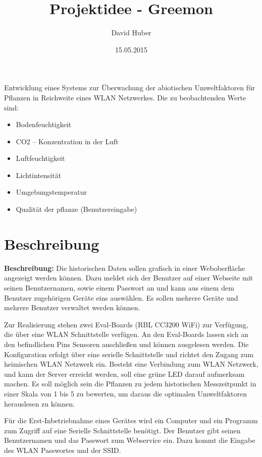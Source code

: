 \documentclass[pointlessnumbers]{scrartcl}
\title{Projektidee - Greemon}
\author{David Huber}
\date{15.05.2015}
\begin{document}
\maketitle

Entwicklung eines Systems zur Überwachung der abiotischen Umweltfaktoren für Pflanzen in Reichweite eines WLAN Netzwerkes. Die zu beobachtenden Werte sind: 

\begin{itemize}
  \item Bodenfeuchtigkeit 
  \item CO2 – Konzentration in der Luft 
  \item Luftfeuchtigkeit 
  \item Lichtintensität
  \item Umgebungstemperatur
  \item Qualität der pflanze (Benutzereingabe)
\end{itemize}

\section*{Beschreibung}
\textbf{Beschreibung:} Die historischen Daten sollen grafisch in einer Weboberfläche angezeigt werden können. Dazu meldet sich der Benutzer auf einer Webseite mit seinen Benutzernamen, sowie einem Passwort an und kann aus einem dem Benutzer zugehörigen Geräte eins auswählen. Es sollen mehrere Geräte und mehrere Benutzer verwaltet werden können. 

Zur Realisierung stehen zwei Eval-Boards (RBL CC3200 WiFi) zur Verfügung, die über eine WLAN Schnittstelle verfügen. 
An den Eval-Boards lassen sich an den befindlichen Pins Sensoren anschließen und können ausgelesen werden. 
Die Konfiguration erfolgt über eine serielle Schnittstelle und richtet den Zugang zum heimischen WLAN Netzwerk ein. 
Besteht eine Verbindung zum WLAN Netzwerk, und kann der Server erreicht werden, soll eine grüne LED darauf aufmerksam machen. 
Es soll möglich sein die Pflanzen zu jedem historischen Messzeitpunkt in einer Skala von 1 bis 5 zu bewerten, um daraus die optimalen Umweltfaktoren herauslesen zu können. 

Für die Erst-Inbetriebnahme eines Gerätes wird ein Computer und ein Programm zum Zugriff auf eine Serielle Schnittstelle benötigt. Der Benutzer gibt seinen Benutzernamen und das Passwort zum Webservice ein. Dazu kommt die Eingabe des WLAN Passwortes und der SSID.     
\end{document}
